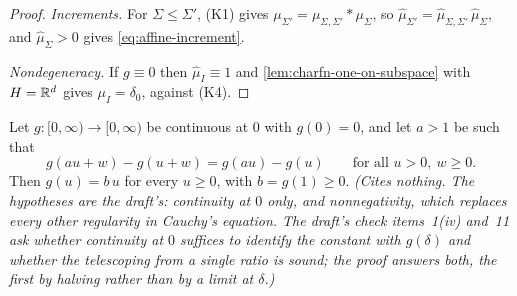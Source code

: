 \begin{proof}
\emph{Increments.} For $\Sigma \le \Sigma'$, (K1) gives $\mu_{\Sigma'} = \mu_{\Sigma,\Sigma'} *
\mu_\Sigma$, so $\widehat\mu_{\Sigma'} = \widehat\mu_{\Sigma,\Sigma'}\,\widehat\mu_\Sigma$, and
$\widehat\mu_\Sigma > 0$ gives \ref{eq:affine-increment}.

\emph{Nondegeneracy.} If $g \equiv 0$ then $\widehat\mu_I \equiv 1$ and
\ref{lem:charfn-one-on-subspace} with $H = \mathbb{R}^d$ gives $\mu_I = \delta_0$, against (K4).
\end{proof}

\begin{lemma}
\label{lem:single-ratio-cauchy}
\leanok
Let $g : [0,\infty) \to [0,\infty)$ be continuous at $0$ with $g(0) = 0$, and let $a > 1$ be such
that
\begin{equation}\label{eq:single-ratio}
  g(au + w) - g(u + w) = g(au) - g(u) \qquad \text{for all } u > 0,\ w \ge 0 .
\end{equation}
Then $g(u) = b\,u$ for every $u \ge 0$, with $b = g(1) \ge 0$.
\statusT\quad\emph{(Cites nothing. The hypotheses are the draft's: continuity at $0$ only, and
nonnegativity, which replaces every other regularity in Cauchy's equation. The draft's check
items~1(iv) and~11 ask whether continuity at $0$ suffices to identify the constant with
$g(\delta)$ and whether the telescoping from a single ratio is sound; the proof answers both, the
first by halving rather than by a limit at $\delta$.)}
\end{lemma}


